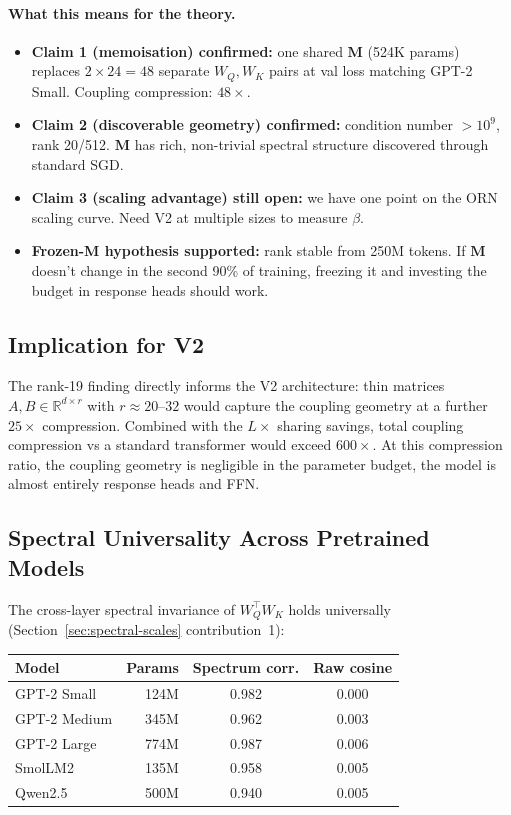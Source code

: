 \documentclass[11pt, a4paper]{article}
\newcommand{\M}{\mathbf{M}}
\newcommand{\R}{\mathbb{R}}
\theoremstyle{remark}
\begin{document}
\paragraph{What this means for the theory.}
\begin{itemize}[nosep]
    \item \textbf{Claim 1 (memoisation) confirmed:} one shared $\M$ (524K params) replaces $2 \times 24 = 48$ separate $W_Q, W_K$ pairs at val loss matching GPT-2 Small.  Coupling compression: $48\times$.
    \item \textbf{Claim 2 (discoverable geometry) confirmed:} condition number $>10^9$, rank 20/512.  $\M$ has rich, non-trivial spectral structure discovered through standard SGD.
    \item \textbf{Claim 3 (scaling advantage) still open:} we have one point on the ORN scaling curve.  Need V2 at multiple sizes to measure $\beta$.
    \item \textbf{Frozen-M hypothesis supported:} rank stable from 250M tokens.  If $\M$ doesn't change in the second 90\% of training, freezing it and investing the budget in response heads should work.
\end{itemize}

\subsection{Implication for V2}

The rank-19 finding directly informs the V2 architecture: thin matrices $A, B \in \R^{d \times r}$ with $r \approx 20$--$32$ would capture the coupling geometry at a further $25\times$ compression.
Combined with the $L\times$ sharing savings, total coupling compression vs a standard transformer would exceed $600\times$.
At this compression ratio, the coupling geometry is negligible in the parameter budget, the model is almost entirely response heads and FFN.

\subsection{Spectral Universality Across Pretrained Models}

The cross-layer spectral invariance of $W_Q^\top W_K$ holds universally (Section~\ref{sec:spectral-scales} contribution~1):

\begin{center}\small
\begin{tabular}{@{}lrcc@{}}
\toprule
\textbf{Model} & \textbf{Params} & \textbf{Spectrum corr.} & \textbf{Raw cosine} \\
\midrule
GPT-2 Small & 124M & 0.982 & 0.000 \\
GPT-2 Medium & 345M & 0.962 & 0.003 \\
GPT-2 Large & 774M & 0.987 & 0.006 \\
SmolLM2 & 135M & 0.958 & 0.005 \\
Qwen2.5 & 500M & 0.940 & 0.005 \\
\bottomrule
\end{tabular}
\end{center}
\end{document}
